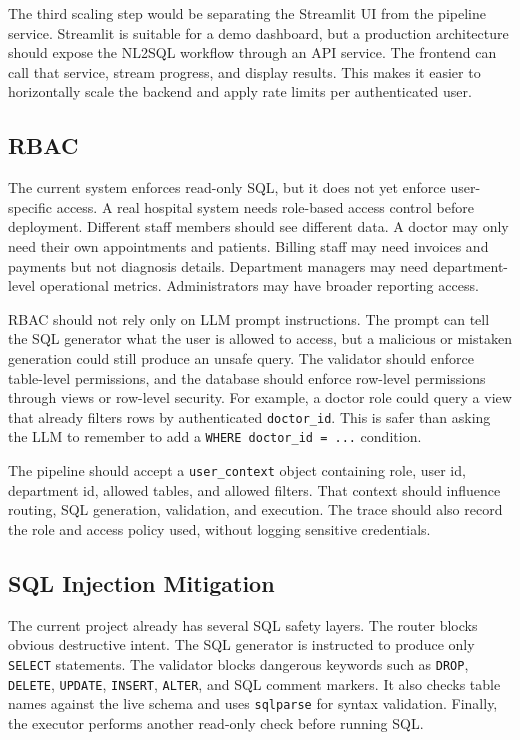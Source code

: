 \documentclass[11pt,a4paper]{article}
\begin{document}
The third scaling step would be separating the Streamlit UI from the pipeline service. Streamlit is suitable for a demo dashboard, but a production architecture should expose the NL2SQL workflow through an API service. The frontend can call that service, stream progress, and display results. This makes it easier to horizontally scale the backend and apply rate limits per authenticated user.

\subsection{RBAC}

The current system enforces read-only SQL, but it does not yet enforce user-specific access. A real hospital system needs role-based access control before deployment. Different staff members should see different data. A doctor may only need their own appointments and patients. Billing staff may need invoices and payments but not diagnosis details. Department managers may need department-level operational metrics. Administrators may have broader reporting access.

RBAC should not rely only on LLM prompt instructions. The prompt can tell the SQL generator what the user is allowed to access, but a malicious or mistaken generation could still produce an unsafe query. The validator should enforce table-level permissions, and the database should enforce row-level permissions through views or row-level security. For example, a doctor role could query a view that already filters rows by authenticated \texttt{doctor\_id}. This is safer than asking the LLM to remember to add a \texttt{WHERE doctor\_id = ...} condition.

The pipeline should accept a \texttt{user\_context} object containing role, user id, department id, allowed tables, and allowed filters. That context should influence routing, SQL generation, validation, and execution. The trace should also record the role and access policy used, without logging sensitive credentials.

\subsection{SQL Injection Mitigation}

The current project already has several SQL safety layers. The router blocks obvious destructive intent. The SQL generator is instructed to produce only \texttt{SELECT} statements. The validator blocks dangerous keywords such as \texttt{DROP}, \texttt{DELETE}, \texttt{UPDATE}, \texttt{INSERT}, \texttt{ALTER}, and SQL comment markers. It also checks table names against the live schema and uses \texttt{sqlparse} for syntax validation. Finally, the executor performs another read-only check before running SQL.
\end{document}
